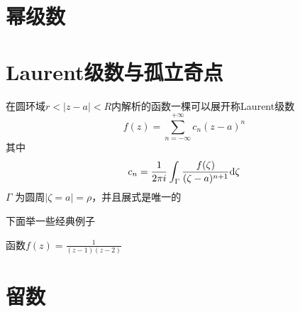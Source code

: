 \documentclass{ctexart}
\begin{document}
\section{幂级数}

\section{Laurent级数与孤立奇点}

\begin{theorem}
    在圆环域$r < |z - a| < R$内解析的函数一棵可以展开称Laurent级数
    \begin{equation*}
        f(z) = \sum_{n = -\infty}^{+\infty} c_n(z - a)^n
    \end{equation*}
    其中
    \begin{equation*}
        c_n = \frac{1}{2\pi i} \int_{\Gamma} \frac{f(\zeta)}{(\zeta - a) ^{n + 1}} \mathrm{d} \zeta
    \end{equation*}
    $\Gamma$ 为圆周$|\zeta = a| = \rho$，并且展式是唯一的
\end{theorem}

下面举一些经典例子
\begin{example}
    函数$f(z) = \frac{1}{(z - 1)(z - 2)}$
\end{example}

\section{留数}
\end{document}
